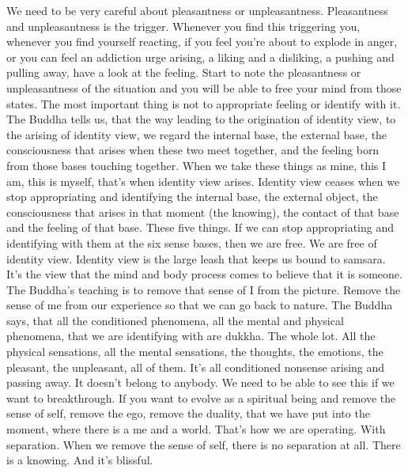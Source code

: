 \documentclass[letterpaper,10pt,english]{sphinxmanual}
\begin{document}
\sphinxAtStartPar
We need to be very careful about pleasantness or unpleasantness. Pleasantness and unpleasantness is the trigger. Whenever you find this triggering
you, whenever you find yourself reacting, if you feel you’re about to explode
in anger, or you can feel an addiction urge arising, a liking and a disliking, a
pushing and pulling away, have a look at the feeling. Start to note the pleasantness or unpleasantness of the situation and you will be able to free your
mind from those states. The most important thing is not to appropriate feeling or identify with it. The Buddha tells us, that the way leading to the origination of identity view, to the arising of identity view, we regard the internal
base, the external base, the consciousness that arises when these two meet
together,  and  the  feeling  born  from  those  bases  touching  together.  When
we take these things as mine, this I am, this is myself, that’s when identity
view arises. Identity view ceases when we stop appropriating and identifying the internal base, the external object, the consciousness that arises in that
moment (the knowing), the contact of that base and the feeling of that base.
These five things. If we can stop appropriating and identifying with them at
the six sense bases, then we are free. We are free of identity view. Identity
view is the large leash that keeps us bound to samsara. It’s the view that the
mind and body process comes to believe that it is someone. The Buddha’s
teaching is to remove that sense of I from the picture. Remove the sense of
me from our experience so that we can go back to nature. The Buddha says,
that all the conditioned phenomena, all the mental and physical phenomena,
that we are identifying with are dukkha. The whole lot. All the physical sensations, all the mental sensations, the thoughts, the emotions, the pleasant,
the unpleasant, all of them. It’s all conditioned nonsense arising and passing
away. It doesn’t belong to anybody. We need to be able to see this if we want
to breakthrough. If you want to evolve as a spiritual being and remove the
sense of self, remove the ego, remove the duality, that we have put into the
moment, where there is a me and a world. That’s how we are operating. With
separation. When we remove the sense of self, there is no separation at all.
There is a knowing. And it’s blissful.
\end{document}
